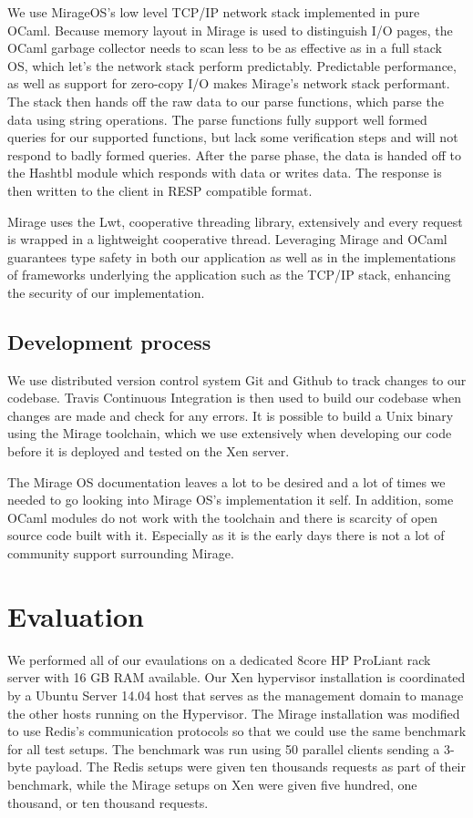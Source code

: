 \documentclass[english,10pt,twocolumn]{article}
\begin{document}
We use MirageOS's low level TCP/IP network stack implemented in pure OCaml.
Because memory layout in Mirage is used to distinguish I/O pages, the OCaml garbage collector needs to scan less to be as effective as in a full stack OS, which let's the network stack perform predictably.
Predictable performance, as well as support for zero-copy I/O makes Mirage's network stack performant.
The stack then hands off the raw data to our parse functions, which parse the data using string operations.
The parse functions fully support well formed queries for our supported functions, but lack some verification steps and will not respond to badly formed queries.
After the parse phase, the data is handed off to the Hashtbl module which responds with data or writes data.
The response is then written to the client in RESP compatible format.

Mirage uses the Lwt, cooperative threading library, extensively and every request is wrapped in a lightweight cooperative thread. Leveraging Mirage and OCaml guarantees type safety in both our application as well as in the implementations of frameworks underlying the application such as the TCP/IP stack, enhancing the security of our implementation.


\subsection{Development process}

We use distributed version control system Git and Github to track changes to our codebase.
Travis Continuous Integration is then used to build our codebase when changes are made and check for any errors.
It is possible to build a Unix binary using the Mirage toolchain, which we use extensively when developing our code before it is deployed and tested on the Xen server.

The Mirage OS documentation leaves a lot to be desired and a lot of times we needed to go looking into Mirage OS's implementation it self.
In addition, some OCaml modules do not work with the toolchain and there is scarcity of open source code built with it.
Especially as it is the early days there is not a lot of community support surrounding Mirage.


\section{Evaluation}

We performed all of our evaulations on a dedicated 8\-core HP ProLiant rack server with 16 GB RAM available.
Our Xen hypervisor installation is coordinated by a Ubuntu Server 14.04 host that serves as the management domain to manage the other hosts running on the Hypervisor.
The Mirage installation was modified to use Redis's communication protocols so that we could use the same benchmark for all test setups. The benchmark was run using 50 parallel clients sending a 3-byte payload.
The Redis setups were given ten thousands requests as part of their benchmark, while the Mirage setups on Xen were given five hundred, one thousand, or ten thousand requests.
\end{document}
